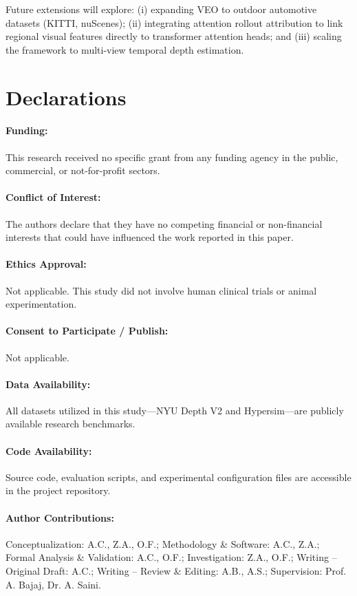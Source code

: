 \documentclass[11pt,a4paper]{article}
\begin{document}
Future extensions will explore: (i) expanding VEO to outdoor automotive datasets (KITTI, nuScenes); (ii) integrating attention rollout attribution to link regional visual features directly to transformer attention heads; and (iii) scaling the framework to multi-view temporal depth estimation.

\section*{Declarations}

\paragraph{Funding:} This research received no specific grant from any funding agency in the public, commercial, or not-for-profit sectors.
\paragraph{Conflict of Interest:} The authors declare that they have no competing financial or non-financial interests that could have influenced the work reported in this paper.
\paragraph{Ethics Approval:} Not applicable. This study did not involve human clinical trials or animal experimentation.
\paragraph{Consent to Participate / Publish:} Not applicable.
\paragraph{Data Availability:} All datasets utilized in this study—NYU Depth V2 and Hypersim—are publicly available research benchmarks.
\paragraph{Code Availability:} Source code, evaluation scripts, and experimental configuration files are accessible in the project repository.
\paragraph{Author Contributions:} Conceptualization: A.C., Z.A., O.F.; Methodology \& Software: A.C., Z.A.; Formal Analysis \& Validation: A.C., O.F.; Investigation: Z.A., O.F.; Writing -- Original Draft: A.C.; Writing -- Review \& Editing: A.B., A.S.; Supervision: Prof. A. Bajaj, Dr. A. Saini.
\end{document}
